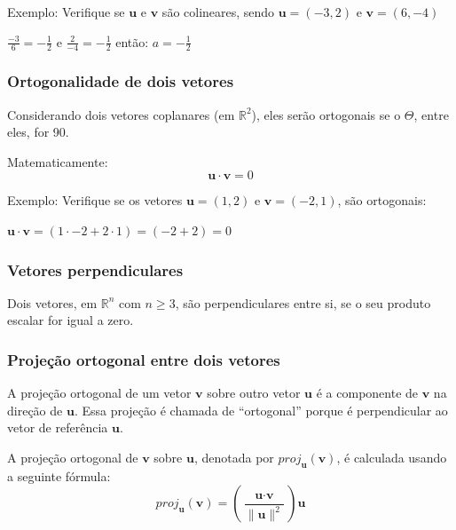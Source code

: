 \documentclass[12pt]{article}
\begin{document}
		

Exemplo: Verifique se \(\textbf{u}\) e \(\textbf{v}\) são colineares, sendo \(\textbf{u} = (-3, 2)\) e \(\textbf{v}=(6,-4)\)

\(\frac{-3}{6} = -\frac{1}{2}\) e \(\frac{2}{-4} = -\frac{1}{2}\) então: \(\textit{a} = -\frac{1}{2}\)

\subsubsection{Ortogonalidade de dois vetores}

Considerando dois vetores coplanares (em \(\mathbb{R}^2\)), eles serão ortogonais se o $\Theta$, entre eles, for 90\degree.

Matematicamente:
\begin{equation}
	\textbf{u}  \cdot  \textbf{v} = 0
\end{equation}

Exemplo: Verifique se os vetores \(\textbf{u} = (1, 2)\) e \(\textbf{v} = (-2, 1)\), são ortogonais:

\(\textbf{u}  \cdot  \textbf{v} = (1  \cdot  -2 + 2  \cdot  1) = (-2 + 2) = 0\)


\subsubsection{Vetores perpendiculares}

Dois vetores, em \(\mathbb{R}^n\) com \(\textit{n} \geq 3\), são perpendiculares entre si, se o seu produto escalar for igual a zero.

\subsubsection{Projeção ortogonal entre dois vetores}

A projeção ortogonal de um vetor \(\textbf{v}\) sobre outro vetor \(\textbf{u}\) é a componente de \(\textbf{v}\) na direção de \(\textbf{u}\). Essa projeção é chamada de \enquote{ortogonal} porque é perpendicular ao vetor de referência \(\textbf{u}\).

A projeção ortogonal de \(\textbf{v}\) sobre \(\textbf{u}\), denotada por \(proj_{\textbf{u}}(\textbf{v})\), é calculada usando a seguinte fórmula:
\begin{equation}
proj_{\textbf{u}}(\textbf{v}) = \left( \frac{\textbf{u} \cdot \textbf{v}}{\|\textbf{u}\|^2} \right) \textbf{u}
\end{equation} 
\end{document}
